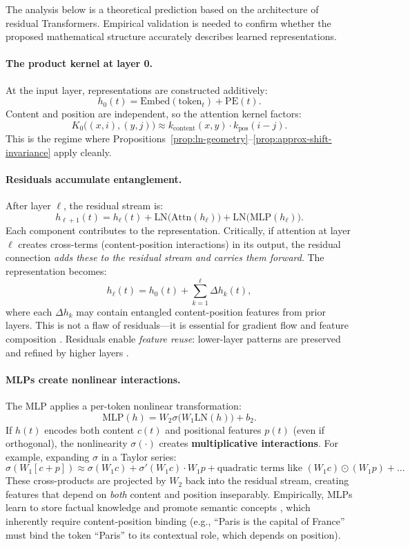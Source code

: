 \documentclass[11pt]{article}
\theoremstyle{definition}
\begin{document}
The analysis below is a theoretical prediction based on the architecture of residual Transformers. Empirical validation is needed to confirm whether the proposed mathematical structure accurately describes learned representations.

\paragraph{The product kernel at layer 0.}
At the input layer, representations are constructed additively:
\[
h_0(t) = \text{Embed}(\text{token}_t) + \text{PE}(t).
\]
Content and position are independent, so the attention kernel factors:
\[
K_0\big((x,i),(y,j)\big) \approx k_{\text{content}}(x,y) \cdot k_{\text{pos}}(i-j).
\]
This is the regime where Propositions~\ref{prop:ln-geometry}--\ref{prop:approx-shift-invariance} apply cleanly.

\paragraph{Residuals accumulate entanglement.}
After layer $\ell$, the residual stream is:
\[
h_{\ell+1}(t) = h_\ell(t) + \text{LN}\big(\text{Attn}(h_\ell)\big) + \text{LN}\big(\text{MLP}(h_\ell)\big).
\]
Each component contributes to the representation. Critically, if attention at layer $\ell$ creates cross-terms (content-position interactions) in its output, the residual connection \emph{adds these to the residual stream and carries them forward}. The representation becomes:
\[
h_\ell(t) = h_0(t) + \sum_{k=1}^\ell \Delta h_k(t),
\]
where each $\Delta h_k$ may contain entangled content-position features from prior layers. This is not a flaw of residuals---it is essential for gradient flow and feature composition \cite{he2016identity,raghu2021vit}. Residuals enable \emph{feature reuse}: lower-layer patterns are preserved and refined by higher layers \cite{huang2017densely,dosovitskiy2021vit}.

\paragraph{MLPs create nonlinear interactions.}
The MLP applies a per-token nonlinear transformation:
\[
\text{MLP}(h) = W_2 \sigma\big(W_1 \text{LN}(h)\big) + b_2.
\]
If $h(t)$ encodes both content $c(t)$ and positional features $p(t)$ (even if orthogonal), the nonlinearity $\sigma(\cdot)$ creates \textbf{multiplicative interactions}. For example, expanding $\sigma$ in a Taylor series:
\[
\sigma(W_1 [c + p]) \approx \sigma(W_1 c) + \sigma'(W_1 c) \cdot W_1 p + \text{quadratic terms like } (W_1 c) \odot (W_1 p) + \ldots
\]
These cross-products are projected by $W_2$ back into the residual stream, creating features that depend on \emph{both} content and position inseparably. Empirically, MLPs learn to store factual knowledge and promote semantic concepts \cite{geva2021mlp,dar2023analyzing}, which inherently require content-position binding (e.g., ``Paris is the capital of France'' must bind the token ``Paris'' to its contextual role, which depends on position).
\end{document}
